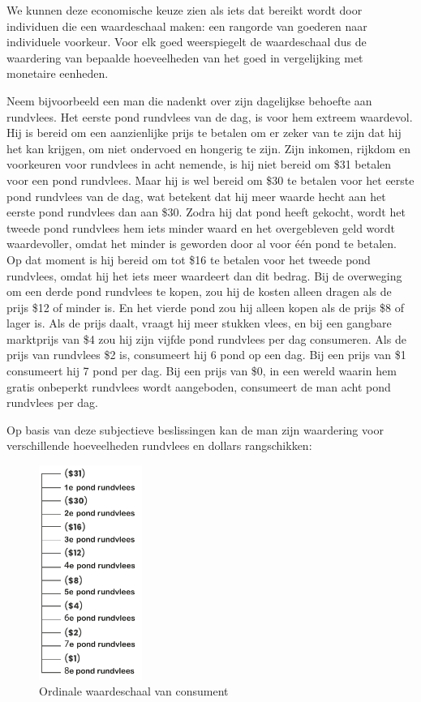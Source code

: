 We kunnen deze economische keuze zien als iets dat bereikt wordt door individuen die een waardeschaal maken: een rangorde van goederen naar individuele voorkeur. Voor elk goed weerspiegelt de waardeschaal dus de waardering van bepaalde hoeveelheden van het goed in vergelijking met monetaire eenheden.

Neem bijvoorbeeld een man die nadenkt over zijn dagelijkse behoefte aan rundvlees. Het eerste pond rundvlees van de dag, is voor hem extreem waardevol. Hij is bereid om een aanzienlijke prijs te betalen om er zeker van te zijn dat hij het kan krijgen, om niet ondervoed en hongerig te zijn. Zijn inkomen, rijkdom en voorkeuren voor rundvlees in acht nemende, is hij niet bereid om \$31 betalen voor een pond rundvlees. Maar hij is wel bereid om \$30 te betalen voor het eerste pond rundvlees van de dag, wat betekent dat hij meer waarde hecht aan het eerste pond rundvlees dan aan \$30. Zodra hij dat pond heeft gekocht, wordt het tweede pond rundvlees hem iets minder waard en het overgebleven geld wordt waardevoller, omdat het minder is geworden door al voor één pond te betalen. Op dat moment is hij bereid om tot \$16 te betalen voor het tweede pond rundvlees, omdat hij het iets meer waardeert dan dit bedrag. Bij de overweging om een derde pond rundvlees te kopen, zou hij de kosten alleen dragen als de prijs \$12 of minder is. En het vierde pond zou hij alleen kopen als de prijs \$8 of lager is. Als de prijs daalt, vraagt hij meer stukken vlees, en bij een gangbare marktprijs van \$4 zou hij zijn vijfde pond rundvlees per dag consumeren. Als de prijs van rundvlees \$2 is, consumeert hij 6 pond op een dag. Bij een prijs van \$1 consumeert hij 7 pond per dag. Bij een prijs van \$0, in een wereld waarin hem gratis onbeperkt rundvlees wordt aangeboden, consumeert de man acht pond rundvlees per dag.

Op basis van deze subjectieve beslissingen kan de man zijn waardering voor verschillende hoeveelheden rundvlees en dollars rangschikken:

\begin{figure}[H]
\centering
    \includegraphics[height=7cm]{figures/fig20.pdf}
    \caption[Ordinale waardeschaal van consument]{Ordinale waardeschaal van consument}
    \label{fig19}
\end{figure}

